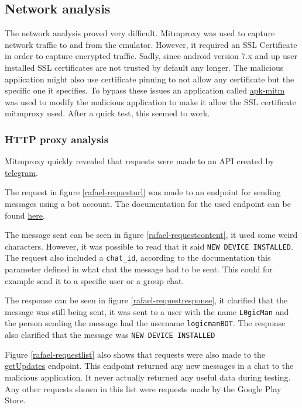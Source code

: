 \subsection{Network analysis}

The network analysis proved very difficult. Mitmproxy was used to capture network traffic to and from the emulator. 
However, it required an SSL Certificate in order to capture encrypted traffic.
Sadly, since android version 7.x and up user installed SSL certificates are not trusted by default any longer.
The malicious application might also use certificate pinning to not allow any certificate but the specific one it specifies.
To bypass these issues an application called \href{https://github.com/shroudedcode/apk-mitm}{apk-mitm} was used to modify the malicious application to make it allow the SSL certificate mitmproxy used.
After a quick test, this seemed to work.

\subsubsection{HTTP proxy analysis}

Mitmproxy quickly revealed that requests were made to an API created by \href{https://telegram.org/}{telegram}.

The request in figure \ref{rafael-requesturl} was made to an endpoint for sending messages using a bot account. 
The documentation for the used endpoint can be found \href{https://core.telegram.org/method/messages.sendMessage}{here}.

The message sent can be seen in figure \ref{rafael-requestcontent}, it used some weird characters.
However, it was possible to read that it said \texttt{NEW DEVICE INSTALLED}.
The request also included a \texttt{chat\_id}, according to the documentation this parameter defined in what chat the message had to be sent.
This could for example send it to a specific user or a group chat.

The response can be seen in figure \ref{rafael-requestresponse}, it clarified that the message was still being sent, 
it was sent to a user with the name \texttt{L0gicMan} and the person sending the message had the username \texttt{logicmanBOT}.
The response also clarified that the message was \texttt{NEW DEVICE INSTALLED}

Figure \ref{rafael-requestlist} also shows that requests were also made to the \href{https://core.telegram.org/bots/api#getupdates}{getUpdates} endpoint.
This endpoint returned any new messages in a chat to the malicious application.
It never actually returned any useful data during testing.
Any other requests shown in this list were requests made by the Google Play Store.

